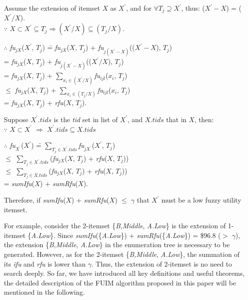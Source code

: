 \documentclass[journal]{IEEEtran}
\newenvironment{proof}{{\noindent\it\bf Proof}\quad}{\par}
\begin{document}
\begin{proof}
	Assume the extension of itemset $X$ as $X^\prime$, and for $\forall T_j \supseteq X^\prime$, thus: ($X^\prime - X$) = ($X^\prime / X$).\\
	$\because$ $X \subset X^\prime \subseteq T_j \Rightarrow (X^\prime / X) \subseteq (T_j / X)$.
	\begin{tabbing}
		$\therefore$ \textit{fu}$_{jX}$($X^\prime$, $T_j$) \=
		= \textit{fu}$_{jX}$($X$, $T_j$) + \textit{fu}$_{j(X^\prime - X)}$(($X^\prime - X$), $T_j$) \\
		\> = \textit{fu}$_{jX}$($X$, $T_j$) + \textit{fu}$_{j(X^\prime - X)}$(($X^\prime / X$), $T_j$) \\
		\> = \textit{fu}$_{jX}$($X$, $T_j$) + $\sum_{x_i \in (X^\prime / X)}$\textit{fu}$_{ijl}$($x_i$, $T_j$) \\
		\> $\le$ \textit{fu}$_{jX}$($X$, $T_j$) + $\sum_{x_i \in (T_j / X)}$\textit{fu}$_{ijl}$($x_i$, $T_j$) \\
		\> =  \textit{fu}$_{jX}$($X$, $T_j$) + \textit{rfu}($X$, $T_j$). \\
	\end{tabbing}
	Suppose $X^\prime.tids$ is the \textit{tid} set in list of $X^\prime$, and $X.tids$ that in $X$, then: \\
	$\because$ $X \subset X^\prime$ $\Rightarrow$ $X^\prime.tids \subseteq X.tids$
	\begin{tabbing}
		$\therefore$ \textit{fu}$_{X^\prime}$($X^\prime$) \=
		= $\sum_{T_j \in X^\prime.tids}$\textit{fu}$_{jX^\prime}$($X^\prime$, $T_j$) \\
		\> $\le$ $\sum_{T_j \in X^\prime.tids}$(\textit{fu}$_{jX}$($X$, $T_j$) + \textit{rfu}($X$, $T_j$)) \\
		\> $\le$ $\sum_{T_j \in X.tids}$(\textit{fu}$_{jX}$($X$, $T_j$) + \textit{rfu}($X$, $T_j$)) \\
		\> = \textit{sumIfu}($X$) + \textit{sumRfu}($X$).
	\end{tabbing}
	Therefore, if \textit{sumIfu}($X$) + \textit{sumRfu}($X$) $\le$ $\gamma$ that $X^\prime$ must be a low fuzzy utility itemset.
\end{proof}

For example, consider the 2-itemset \{\textit{B,Middle}, \textit{A.Low}\} is the extension of 1-itemset \{\textit{A.Low}\}. Since \textit{sumIfu}(\{\textit{A.Low}\}) + \textit{sumRfu}(\{\textit{A.Low}\}) = \$96.8 ($>$ $\gamma$), the extension \{\textit{B,Middle}, \textit{A.Low}\} in the enumeration tree is necessary to be generated. However, as for the 2-itemset \{\textit{B,Middle}, \textit{A.Low}\}, the summation of its \textit{ifu} and \textit{rfu} is lower than $\gamma$. Thus, the extension of 2-itemset is no need to search deeply. So far, we have introduced all key definitions and useful theorems, the detailed description of the FUIM algorithm proposed in this paper will be mentioned in the following.
\end{document}
